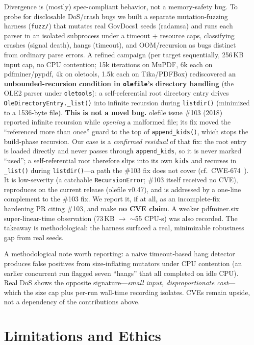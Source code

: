 \documentclass[11pt]{article}
\newcommand{\code}[1]{\texttt{#1}}
\begin{document}
Divergence is (mostly) spec-compliant behavior, not a memory-safety bug. To
probe for disclosable DoS/crash bugs we built a separate mutation-fuzzing
harness (\code{fuzz/}) that mutates real GovDocs1 seeds (radamsa) and runs each
parser in an isolated subprocess under a timeout + resource caps, classifying
crashes (signal death), hangs (timeout), and OOM/recursion as bugs distinct from
ordinary parse errors. A refined campaign (per target sequentially, 256\,KB
input cap, no CPU contention; 15k iterations on MuPDF, 6k each on pdfminer/pypdf,
4k on oletools, 1.5k each on Tika/PDFBox) rediscovered an
\textbf{unbounded-recursion condition in \code{olefile}'s directory handling}
(the OLE2 parser under \code{oletools}): a self-referential root directory entry
drives \code{OleDirectoryEntry.\_list()} into infinite recursion during
\code{listdir()} (minimized to a 1536-byte file). \textbf{This is not a novel
bug.} olefile issue \#103 (2018)~\cite{olefile103} reported infinite recursion
while \emph{opening} a malformed file; its fix moved the ``referenced more than
once'' guard to the top of \code{append\_kids()}, which stops the build-phase
recursion. Our case is a \emph{confirmed residual} of that fix: the root entry
is loaded directly and never passes through \code{append\_kids}, so it is never
marked ``used''; a self-referential root therefore slips into its own
\code{kids} and recurses in \code{\_list()} during \code{listdir()}---a path the
\#103 fix does not cover (cf.\ CWE-674~\cite{cwe674}). It is low-severity (a
catchable \code{RecursionError}; \#103 itself received no CVE), reproduces on the
current release (olefile v0.47), and is addressed by a one-line complement to the
\#103 fix. We
report it, if at all, as an incomplete-fix hardening PR citing \#103, and make
\textbf{no CVE claim}. A weaker pdfminer.six super-linear-time observation
(73\,KB $\rightarrow$ ${\sim}$55 CPU-s) was also recorded. The takeaway is
methodological: the harness surfaced a real, minimizable robustness gap from real
seeds.

A methodological note worth reporting: a naive timeout-based hang detector
produces false positives from size-inflating mutators under CPU contention (an
earlier concurrent run flagged seven ``hangs'' that all completed on idle CPU).
Real DoS shows the opposite signature---\emph{small input, disproportionate
cost}---which the size cap plus per-run wall-time recording isolates. CVEs remain
upside, not a dependency of the contributions above.

\section{Limitations and Ethics}
\label{sec:limitations}
\end{document}
